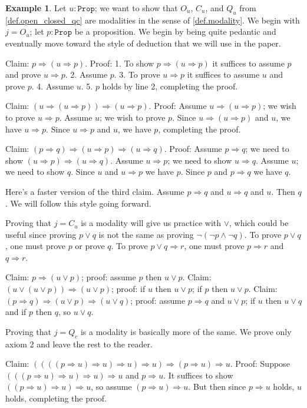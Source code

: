 \documentclass[reqno,11pt]{amsproc}
\theoremstyle{plain}
\theoremstyle{definition}
\newtheorem{example}[theorem]{Example}
\newcommand{\Const}[1]{\mathtt{#1}}
\newcommand{\prop}{\Const{Prop}}
\newcommand{\imp}{\Rightarrow}
\numberwithin{equation}{section}
\begin{document}
\begin{example}\label{ex.modality_deduction}
Let $u:\prop$; we want to show that $O_u$, $C_u$, and $Q_u$ from \cref{def.open_closed_qc} are modalities in the sense of \cref{def.modality}. We begin with $j=O_u$; let $p:\prop$ be a proposition. We begin by being quite pedantic and eventually move toward the style of deduction that we will use in the paper.

Claim: $p\imp (u\imp p)$. Proof: 1. To show $p\imp (u\imp p)$ it suffices to assume $p$ and prove $u\imp p$. 2. Assume $p$. 3. To prove $u\imp p$ it suffices to assume $u$ and prove $p$. 4. Assume $u$. 5. $p$ holds by line 2, completing the proof.

Claim: $(u\imp(u\imp p))\imp (u\imp p)$. Proof: Assume $u\imp (u\imp p)$; we wish to prove $u\imp p$. Assume $u$; we wish to prove $p$. Since $u\imp (u\imp p)$ and $u$, we have $u\imp p$. Since $u\imp p$ and $u$, we have $p$, completing the proof.

Claim: $(p\imp q)\imp (u\imp p)\imp (u\imp q)$. Proof: Assume $p\imp q$; we need to show $(u\imp p)\imp (u\imp q)$. Assume $u\imp p$; we need to show $u\imp q$. Assume $u$; we need to show $q$. Since $u$ and $u\imp p$ we have $p$. Since $p$ and $p\imp q$ we have $q$.

Here's a faster version of the third claim. Assume $p\imp q$ and $u\imp q$ and $u$. Then $q$. We will follow this style going forward.

Proving that $j=C_u$ is a modality will give us practice with $\vee$, which could be useful since proving $p\vee q$ is not the same as proving $\neg(\neg p\wedge\neg q)$. To prove $p\vee q$, one must prove $p$ or prove $q$. To prove $p\vee q \imp r$, one must prove $p\imp r$ and $q\imp r$.

Claim: $p\imp (u\vee p)$; proof: assume $p$ then $u\vee p$. Claim: $(u\vee (u\vee p))\imp (u\vee p)$; proof: if $u$ then $u\vee p$; if $p$ then $u\vee p$. Claim: $(p\imp q)\imp (u\vee p)\imp (u\vee q)$; proof: assume $p\imp q$ and $u\vee p$; if $u$ then $u\vee q$ and if $p$ then $q$, so $u\vee q$.

Proving that $j=Q_c$ is a modality is basically more of the same. We prove only axiom 2 and leave the rest to the reader.

Claim: $((((p\imp u)\imp u)\imp u)\imp u)\imp (p\imp u)\imp u$. Proof: Suppose $(((p\imp u)\imp u)\imp u)\imp u$ and $p\imp u$. It suffices to show $((p\imp u)\imp u)\imp u$, so assume $(p\imp u)\imp u$. But then since $p\imp u$ holds, $u$ holds, completing the proof.
\end{example}
\end{document}
